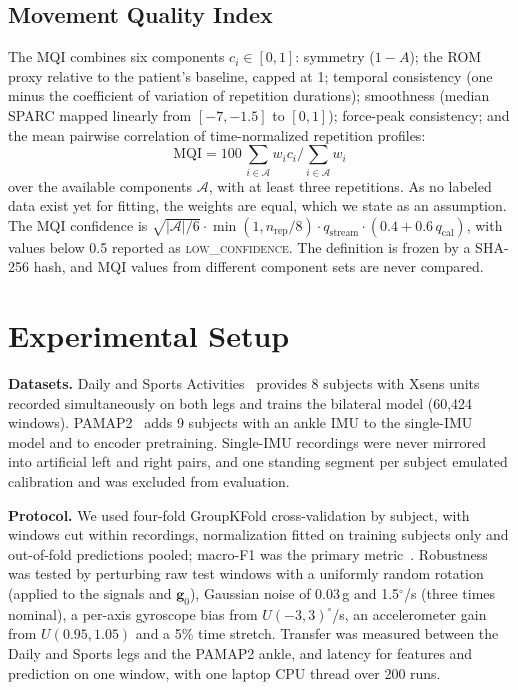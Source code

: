 \documentclass[conference]{IEEEtran}
\newcommand{\vect}[1]{\mathbf{#1}}
\begin{document}
\subsection{Movement Quality Index}
The MQI combines six components $c_i\in[0,1]$: symmetry ($1-A$); the ROM proxy relative to the patient's baseline, capped at 1; temporal consistency (one minus the coefficient of variation of repetition durations); smoothness (median SPARC mapped linearly from $[-7,-1.5]$ to $[0,1]$); force-peak consistency; and the mean pairwise correlation of time-normalized repetition profiles:
\begin{equation}
\mathrm{MQI}=100\,\textstyle\sum_{i\in\mathcal{A}}w_i c_i\big/\sum_{i\in\mathcal{A}}w_i
\label{eq:mqi}
\end{equation}
over the available components $\mathcal{A}$, with at least three repetitions. As no labeled data exist yet for fitting, the weights are equal, which we state as an assumption. The MQI confidence is $\sqrt{\lvert\mathcal{A}\rvert/6}\cdot\min(1,n_{\mathrm{rep}}/8)\cdot q_{\mathrm{stream}}\cdot(0.4+0.6\,q_{\mathrm{cal}})$, with values below 0.5 reported as \textsc{low\_confidence}. The definition is frozen by a SHA-256 hash, and MQI values from different component sets are never compared.

\section{Experimental Setup}

\textbf{Datasets.} Daily and Sports Activities~\cite{altun2010} provides 8 subjects with Xsens units recorded simultaneously on both legs and trains the bilateral model (60{,}424 windows). PAMAP2~\cite{reiss2012} adds 9 subjects with an ankle IMU to the single-IMU model and to encoder pretraining. Single-IMU recordings were never mirrored into artificial left and right pairs, and one standing segment per subject emulated calibration and was excluded from evaluation.

\textbf{Protocol.} We used four-fold GroupKFold cross-validation by subject, with windows cut within recordings, normalization fitted on training subjects only and out-of-fold predictions pooled; macro-F1 was the primary metric~\cite{saeb2017}. Robustness was tested by perturbing raw test windows with a uniformly random rotation (applied to the signals and $\vect{g}_0$), Gaussian noise of 0.03\,g and 1.5$^\circ$/s (three times nominal), a per-axis gyroscope bias from $U(-3,3)^\circ$/s, an accelerometer gain from $U(0.95,1.05)$ and a 5\% time stretch. Transfer was measured between the Daily and Sports legs and the PAMAP2 ankle, and latency for features and prediction on one window, with one laptop CPU thread over 200 runs.
\end{document}
